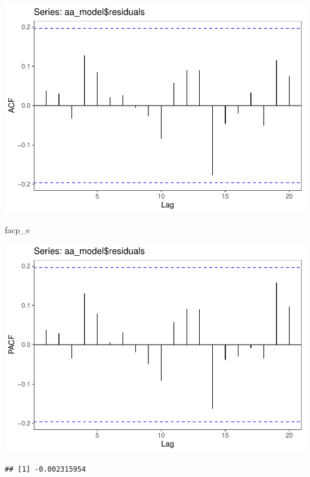 \documentclass[]{article}
\newenvironment{Shaded}{\begin{snugshade}}{\end{snugshade}}
\newcommand{\KeywordTok}[1]{\textcolor[rgb]{0.13,0.29,0.53}{\textbf{#1}}}
\newcommand{\NormalTok}[1]{#1}
\newcommand{\OperatorTok}[1]{\textcolor[rgb]{0.81,0.36,0.00}{\textbf{#1}}}
\begin{document}
\includegraphics{Econo2_P4_files/figure-latex/estimation autoarima-1.pdf}

\begin{Shaded}
\begin{Highlighting}[]
\NormalTok{facp_e}
\end{Highlighting}
\end{Shaded}

\includegraphics{Econo2_P4_files/figure-latex/estimation autoarima-2.pdf}

\begin{Shaded}
\end{Shaded}

\begin{verbatim}
## [1] -0.002315954
\end{verbatim}
\end{document}
